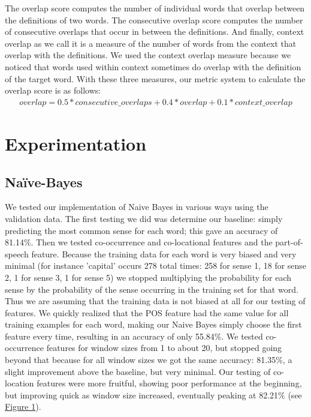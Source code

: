 \documentclass{article}
\begin{document}
The overlap score computes the number of individual words that overlap between the definitions of two words. The consecutive overlap score computes the number of consecutive overlaps that occur in between the definitions. And finally, context overlap as we call it is a measure of the number of words from the context that overlap with the definitions. We used the context overlap measure because we noticed that words used within context sometimes do overlap with the definition of the target word. With these three measures, our metric system to calculate the overlap score is as follows:
\begin{align}
overlap = 0.5*consecutive\_overlaps + 0.4*overlap + 0.1*context\_overlap
\end{align}

\section{Experimentation}

\subsection{Na\"{i}ve-Bayes}

We tested our implementation of Naive Bayes in various ways using the validation data. The first testing we did was determine our baseline: simply predicting the most common sense for each word; this gave an accuracy of 81.14\%. Then we tested co-occurrence and co-locational features and the part-of-speech feature. Because the training data for each word is very biased and very minimal (for instance 'capital' occurs 278 total times: 258 for sense 1, 18 for sense 2, 1 for sense 3, 1 for sense 5) we stopped multiplying the probability for each sense by the probability of the sense occurring in the training set for that word. Thus we are assuming that the training data is not biased at all for our testing of features. We quickly realized that the POS feature had the same value for all training examples for each word, making our Naive Bayes simply choose the first feature every time, resulting in an accuracy of only 55.84\%. We tested co-occurrence features for window sizes from 1 to about 20, but stopped going beyond that because for all window sizes we got the same accuracy: 81.35\%, a slight improvement above the baseline, but very minimal. Our testing of co-location features were more fruitful, showing poor performance at the beginning, but improving quick as window size increased, eventually peaking at 82.21\% (see \hyperref[fig:col]{Figure 1}).
\end{document}
